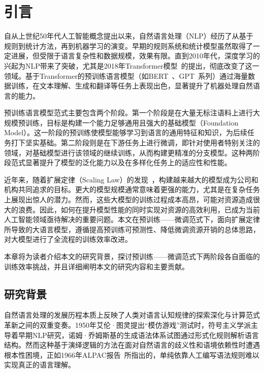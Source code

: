 
\chapter{引言}

自从上世纪50年代人工智能概念提出以来，自然语言处理（NLP）经历了从基于规则到统计方法，再到机器学习的演变。早期的规则系统和统计模型虽然取得了一定进展，但受限于语言复杂性和数据规模，效果有限。直到2010年代，深度学习的兴起为NLP带来了突破，尤其是2018年Transformer模型~\cite{Vaswani+2017}的提出，彻底改变了这一领域。基于Transformer的预训练语言模型（如BERT~\cite{devlin2018bert}、GPT~\cite{radford2018improving}系列）通过海量数据训练，在文本理解、生成和翻译等任务上表现出色，显著提升了机器处理自然语言的能力。 


预训练语言模型范式主要包含两个阶段。第一个阶段是在大量无标注语料上进行大规模预训练，目标是构建一个能力足够通用且强大的基础模型（Foundation Model）。这一阶段的预训练使模型能够学习到语言的通用特征和知识，为后续任务打下坚实基础。第二阶段则是在下游任务上进行微调，即针对使用者特别关注的领域，对基础模型进行该领域的继续训练，从而构建更精准的分支模型。这种两阶段范式显著提升了模型的泛化能力以及在多样化任务上的适应性和性能。

近年来，随着扩展定律（Scaling Law）的发现~\cite{kaplan2020scaling}，构建越来越大的模型成为公司和机构共同追求的目标。更大的模型规模通常意味着更强的能力，尤其是在复杂任务上展现出惊人的潜力。然而，这些大模型的训练过程成本高昂，可能对资源造成很大的浪费。因此，如何在提升模型性能的同时实现对资源的高效利用，已成为当前人工智能领域亟待解决的重要问题。本文在预训练——微调范式下，面向扩展定律所导致的大语言模型，遵循提高预训练可预测性、降低微调资源开销的总体思路，对大模型进行了全流程的训练效率改进。

本章将为读者介绍本文的研究背景，探讨预训练——微调范式下两阶段各自面临的训练效率挑战，并且详细阐明本文的研究内容和主要贡献。


\section{研究背景}

自然语言处理的发展历程本质上反映了人类对语言认知规律的探索深化与计算范式革新之间的双重变奏。1950年艾伦·图灵提出“模仿游戏”测试时，符号主义学派主导着早期NLP研究，诺姆·乔姆斯基的生成语法体系试图通过形式化规则解析语言结构。然而这种基于演绎逻辑的方法在面对自然语言的歧义性和语境依赖性时遭遇根本性困境，正如1966年ALPAC报告~\cite{ALPAC}所指出的，单纯依靠人工编写语法规则难以实现真正的语言理解。

